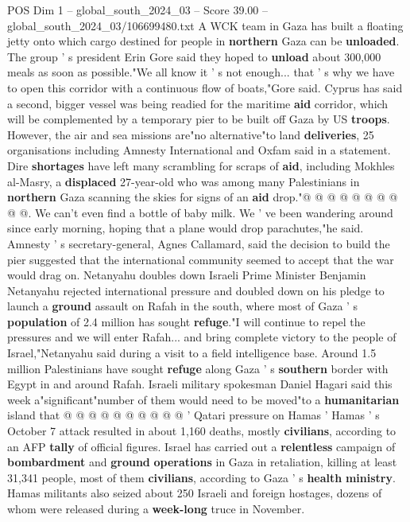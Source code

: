 \begin{textsample}{POS Dim 1 – global\_south\_2024\_03 – Score 39.00 – global\_south\_2024\_03/106699480.txt}
A WCK team in Gaza has built a floating jetty onto which cargo destined for people in \textbf{northern} Gaza can be \textbf{unloaded}.
The group ' s president Erin Gore said they hoped to \textbf{unload} about 300,000 meals as soon as possible."We all know it ' s not enough... that ' s why we have to open this corridor with a continuous flow of boats,"Gore said.
Cyprus has said a second, bigger vessel was being readied for the maritime \textbf{aid} corridor, which will be complemented by a temporary pier to be built off Gaza by US \textbf{troops}.
However, the air and sea missions are"no alternative"to land \textbf{deliveries}, 25 organisations including Amnesty International and Oxfam said in a statement.
Dire \textbf{shortages} have left many scrambling for scraps of \textbf{aid}, including Mokhles al-Masry, a \textbf{displaced} 27-year-old who was among many Palestinians in \textbf{northern} Gaza scanning the skies for signs of an \textbf{aid} drop."@ @ @ @ @ @ @ @ @ @.
We can't even find a bottle of baby milk.
We ' ve been wandering around since early morning, hoping that a plane would drop parachutes,"he said.
Amnesty ' s secretary-general, Agnes Callamard, said the decision to build the pier suggested that the international community seemed to accept that the war would drag on.
Netanyahu doubles down Israeli Prime Minister Benjamin Netanyahu rejected international pressure and doubled down on his pledge to launch a \textbf{ground} assault on Rafah in the south, where most of Gaza ' s \textbf{population} of 2.4 million has sought \textbf{refuge}."I will continue to repel the pressures and we will enter Rafah... and bring complete victory to the people of Israel,"Netanyahu said during a visit to a field intelligence base.
Around 1.5 million Palestinians have sought \textbf{refuge} along Gaza ' s \textbf{southern} border with Egypt in and around Rafah.
Israeli military spokesman Daniel Hagari said this week a"significant"number of them would need to be moved"to a \textbf{humanitarian} island that @ @ @ @ @ @ @ @ @ @ ' Qatari pressure on Hamas ' Hamas ' s October 7 attack resulted in about 1,160 deaths, mostly \textbf{civilians}, according to an AFP \textbf{tally} of official figures.
Israel has carried out a \textbf{relentless} campaign of \textbf{bombardment} and \textbf{ground} \textbf{operations} in Gaza in retaliation, killing at least 31,341 people, most of them \textbf{civilians}, according to Gaza ' s \textbf{health} \textbf{ministry}.
Hamas militants also seized about 250 Israeli and foreign hostages, dozens of whom were released during a \textbf{week-long} truce in November.

\end{textsample}
